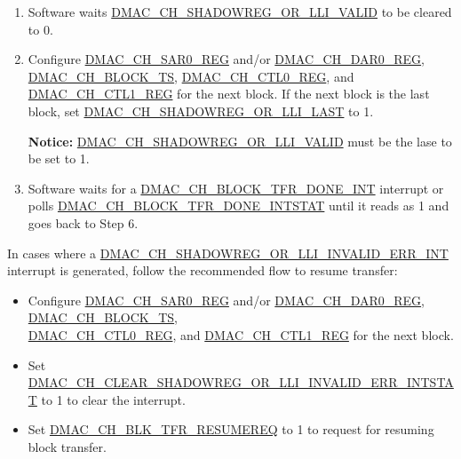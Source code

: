 \documentclass[main\_\_EN.tex]{subfiles}
\begin{document}
\begin{enumerate}
    \item Software waits \hyperref[fielddesc:DMACCHNSHADOWREGORLLIVALID]{DMAC\_CH\_SHADOWREG\_OR\_LLI\_VALID} to be cleared to 0.

    \item Configure \hyperref[regdesc:DMACCHNSAR0REG]{DMAC\_CH\_SAR0\_REG} and/or \hyperref[regdesc:DMACCHNDAR0REG]{DMAC\_CH\_DAR0\_REG}, \hyperref[fielddesc:DMACCHNBLOCKTS]{DMAC\_CH\_BLOCK\_TS}, \hyperref[regdesc:DMACCHNCTL0REG]{DMAC\_CH\_CTL0\_REG}, and \hyperref[regdesc:DMACCHNCTL1REG]{DMAC\_CH\_CTL1\_REG} for the next block. If the next block is the last block, set \hyperref[fielddesc:DMACCHNSHADOWREGORLLILAST]{DMAC\_CH\_SHADOWREG\_OR\_LLI\_LAST} to 1.

    {\bfseries Notice:} \hyperref[fielddesc:DMACCHNSHADOWREGORLLIVALID]{DMAC\_CH\_SHADOWREG\_OR\_LLI\_VALID} must be the lase to be set to 1.

    \item Software waits for a \hyperref[int:DMACCHNBLOCKTFRDONEINT]{DMAC\_CH\_BLOCK\_TFR\_DONE\_INT} interrupt or polls \hyperref[fielddesc:DMACCHNBLOCKTFRDONEINTSTAT]{DMAC\_CH\_BLOCK\_TFR\_DONE\_INTSTAT} until it reads as 1 and goes back to Step 6.

\end{enumerate}

\begin{tiplisting}
In cases where a \hyperref[int:DMACCHNSHADOWREGORLLIINVALIDERRINT]{DMAC\_CH\_SHADOWREG\_OR\_LLI\_INVALID\_ERR\_INT} interrupt is generated, follow the recommended flow to resume transfer:

\begin{itemize}
    \item Configure \hyperref[regdesc:DMACCHNSAR0REG]{DMAC\_CH\_SAR0\_REG} and/or \hyperref[regdesc:DMACCHNDAR0REG]{DMAC\_CH\_DAR0\_REG}, \hyperref[fielddesc:DMACCHNBLOCKTS]{DMAC\_CH\_BLOCK\_TS}, \\\hyperref[regdesc:DMACCHNCTL0REG]{DMAC\_CH\_CTL0\_REG}, and \hyperref[regdesc:DMACCHNCTL1REG]{DMAC\_CH\_CTL1\_REG} for the next block.

    \item Set \hyperref[fielddesc:DMACCHNCLEARSHADOWREGORLLIINVALIDERRINTSTAT] {DMAC\_CH\_CLEAR\_SHADOWREG\_OR\_LLI\_INVALID\_ERR\_INTSTAT} to 1 to clear the interrupt.

    \item Set \hyperref[fielddesc:DMACCHNBLKTFRRESUMEREQ]{DMAC\_CH\_BLK\_TFR\_RESUMEREQ} to 1 to request for resuming block transfer.
\end{itemize}
\end{tiplisting}
\end{document}

